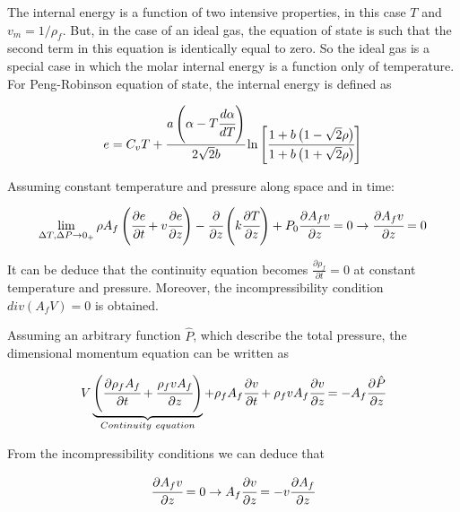 \documentclass[../Article_Model_Parameters.tex]{subfiles}
\begin{document}
	The internal energy is a function of two intensive properties, in this case $T$ and $v_m=1/\rho_f$. But, in the case of an ideal gas, the equation of state is such that the second term in this equation is identically equal to zero. So the ideal gas is a special case in which the molar internal energy is a function only of temperature. For Peng-Robinson equation of state, the internal energy is defined as 
	
	{\footnotesize
	\begin{equation*}
		e = C_vT + \cfrac{a\left(\alpha -T\cfrac{d \alpha}{dT}\right)}{2\sqrt{2}b} \ln \left[ \cfrac{1+b\left(1-\sqrt{2}\rho\right) }{1+b\left(1+\sqrt{2}\rho\right)} \right]
	\end{equation*} }

	Assuming constant temperature and pressure along space and in time:
	
	{\footnotesize
		\begin{equation*}
			\lim_{\Delta T, \Delta P \rightarrow 0_+ } \rho A_f \left( \cfrac{\partial e }{\partial t} + v \cfrac{\partial e}{\partial z} \right) - \cfrac{\partial}{\partial z} \left( k \cfrac{\partial T}{\partial z} \right) + P_0 \cfrac{\partial A_f v}{\partial z} = 0 \rightarrow \cfrac{\partial A_f v}{\partial z} = 0
		\end{equation*}
	}
	
	It can be deduce that the continuity equation becomes $\frac{\partial \rho_f}{\partial t} = 0$ at constant temperature and pressure. Moreover, the incompressibility condition $div(A_fV)=0$ is obtained.
	
	Assuming an arbitrary function $\hat{P}$, which describe the total pressure, the dimensional momentum equation can be written as
	
	{\footnotesize
		\begin{equation*}
			V \underbrace{ \left( \cfrac{\partial \rho_f A_f}{\partial t} + \cfrac{\rho_f v A_f}{\partial z} \right) }_{Continuity~equation} + \rho_f A_f \cfrac{\partial v}{\partial t} + \rho_f v A_f \cfrac{\partial v}{\partial z} = - A_f \cfrac{\partial \hat{P}}{\partial z}
		\end{equation*}
	}
	
	From the incompressibility conditions we can deduce that
	
	{\footnotesize
		\begin{equation*}
			\cfrac{\partial A_f v}{\partial z} = 0 \rightarrow A_f \cfrac{\partial v}{\partial z} = - v \cfrac{\partial A_f}{\partial z}
		\end{equation*}
	}
	
\end{document}
